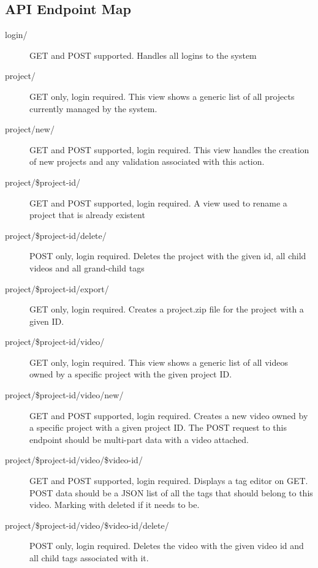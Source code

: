 \documentclass[12pt]{report}
\begin{document}
\begin{appendices}
    \subsection{API Endpoint Map}
    \begin{description}
        \item[login/] GET and POST supported. Handles all logins to the system
        \item[project/] GET only, login required. This view shows a generic
            list of all projects currently managed by the system. 
        \item[project/new/] GET and POST supported, login required. This view
            handles the creation of new projects and any validation associated with this action.
        \item[project/\$project-id/] GET and POST supported, login required. A
            view used to rename a project that is already existent
        \item[project/\$project-id/delete/] POST only, login required. Deletes the project with
            the given id, all child videos and all grand-child tags
        \item[project/\$project-id/export/] GET only, login required. Creates a
            project.zip file for the project with a given ID.
        \item[project/\$project-id/video/] GET only, login required. This view
            shows a generic list of all videos owned by a specific project with
            the given project ID.
        \item[project/\$project-id/video/new/] GET and POST supported, login
            required. Creates a new video owned by a specific project with a
            given project ID. The POST request to this endpoint should be
            multi-part data with a video attached.
        \item[project/\$project-id/video/\$video-id/] GET and POST supported,
            login required. Displays a tag editor on GET. POST data should be a
            JSON list of all the tags that should belong to this video. Marking
            with deleted if it needs to be.
        \item[project/\$project-id/video/\$video-id/delete/] POST only, login
            required. Deletes the video with the given video id and all child
            tags associated with it.
    \end{description}


\end{appendices}
\end{document}
